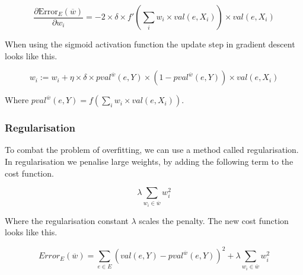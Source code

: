 \[ \frac{\partial \text{Error}_E(\overline{w})}{\partial w_i} 
	= -2 \times \delta \times f'\left(\sum_i w_i \times val(e,X_i)\right) \times val(e,X_i) \]

When using the sigmoid activation function the update step in gradient descent looks like this.

\[ w_i := w_i + \eta \times \delta \times pval^{\overline{w}}(e,Y) \times \left(1 - pval^{\overline{w}}(e,Y)\right) \times val(e,X_i) \]

Where $pval^{\overline{w}}(e,Y) = f(\sum_i w_i \times val(e,X_i))$.  


\begin{flushright}
\cite[p. 306-307]{AI2010}
\end{flushright}


\subsubsection{Regularisation}\label{sec:regular}
To combat the problem of overfitting, we can use a method called regularisation.
In regularisation we penalise large weights, by adding the following term to the cost function.


\[ \lambda \sum_{w_i \in \overline{w}} w_i^2 \]

Where the regularisation constant $\lambda$ scales the penalty. 
The new cost function looks like this.

\[ Error_E(\overline{w}) = \sum_{e \in E} \left(val(e,Y) - pval^{\overline{w}}(e,Y)\right)^2 + \lambda \sum_{w_i \in \overline{w}} w_i^2 \]


\begin{flushright}
\cite[online course]{courseraAI}
\end{flushright}














